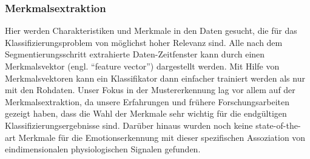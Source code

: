 \subsubsection{Merkmalsextraktion} \label{merkmalsextraktion-0}

Hier werden Charakteristiken und Merkmale in den Daten gesucht, die f{\"u}r das Klassifizierungsproblem von m{\"o}glichst hoher Relevanz sind. Alle nach dem Segmentierungsschritt extrahierte Daten-Zeitfenster kann durch einen Merkmalsvektor (engl. ``feature vector'') dargestellt werden. Mit Hilfe von Merkmalsvektoren kann ein Klassifikator dann einfacher trainiert werden als nur mit den Rohdaten.
Unser Fokus in der Mustererkennung lag vor allem auf der Merkmalsextraktion, da unsere Erfahrungen und fr{\"u}here Forschungsarbeiten gezeigt haben, dass die Wahl der Merkmale sehr wichtig f{\"u}r die endg{\"u}ltigen Klassifizierungsergebnisse sind. Dar{\"u}ber hinaus wurden noch keine state-of-the-art Merkmale f{\"u}r die Emotionserkennung mit dieser spezifischen Assoziation von eindimensionalen physiologischen Signalen gefunden. \\